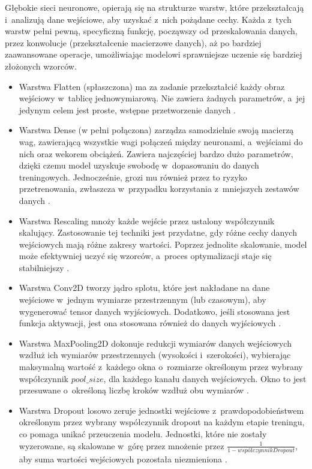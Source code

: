 Głębokie sieci neuronowe, opierają się na strukturze warstw,
które przekształcają i~analizują dane wejściowe, aby uzyskać z~nich pożądane cechy.
Każda z~tych warstw pełni pewną, specyficzną funkcję, począwszy od przeskalowania danych,
przez konwolucje (przekształcenie macierzowe danych),
aż po bardziej zaawansowane operacje, umożliwiając modelowi sprawniejsze uczenie się bardziej złożonych wzorców.
\begin{itemize}[label=-,labelsep=0.4cm,leftmargin=0.6cm]   
	\item Warstwa Flatten (spłaszczona) ma za zadanie przekształcić każdy obraz wejściowy w~tablicę jednowymiarową.
		Nie zawiera żadnych parametrów, a~jej jedynym celem jest proste, wstępne przetworzenie danych \cite{Geron2020}.
	\item Warstwa Dense (w pełni połączona) zarządza samodzielnie swoją macierzą wag,
		zawierającą wszystkie wagi połączeń między neuronami, a~wejściami do nich oraz wekorem obciążeń.
		Zawiera najczęściej bardzo dużo parametrów, dzięki czemu model uzyskuje swobodę w~dopasowaniu do danych treningowych.
		Jednocześnie, grozi mu również przez to ryzyko przetrenowania,
		zwłaszcza w~przypadku korzystania z~mniejszych zestawów danych \cite{Geron2020}.
    \item Warstwa Rescaling mnoży każde wejście przez ustalony współczynnik skalujący.
		Zastosowanie tej techniki jest przydatne, gdy różne cechy danych wejściowych mają różne zakresy wartości.
		Poprzez jednolite skalowanie, model może efektywniej uczyć się wzorców, a~proces optymalizacji staje się stabilniejszy \cite{Fenner2020}.
	\item Warstwa Conv2D tworzy jądro splotu, które jest nakładane na dane wejściowe w~jednym wymiarze przestrzennym (lub czasowym), 
		aby wygenerować tensor danych wyjściowych.
		Dodatkowo, jeśli stosowana jest funkcja aktywacji, jest ona stosowana również do danych wyjściowych \cite{Geron2020}.
	\item Warstwa MaxPooling2D dokonuje redukcji wymiarów danych wejściowych wzdłuż ich wymiarów przestrzennych (wysokości i~szerokości),
		wybierając maksymalną wartość z~każdego okna o~rozmiarze określonym przez wybrany współczynnik $pool\_size$,
		dla każdego kanału danych wejściowych.
		Okno to jest przesuwane o~określoną liczbę kroków wzdłuż obu wymiarów \cite{Geron2020}.
	\item Warstwa Dropout losowo zeruje jednostki wejściowe z~prawdopodobieństwem określonym
		przez wybrany współczynnik dropout na każdym etapie treningu, co pomaga unikać przeuczenia modelu.
		Jednostki, które nie zostały wyzerowane, są skalowane w~górę przez mnożenie przez $\frac{1}{1 - współczynnikDropout}$,
		aby suma wartości wejściowych pozostała niezmieniona \cite{Geron2020}.
\end{itemize}